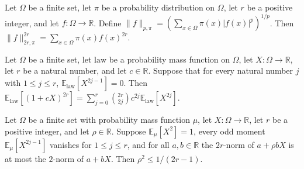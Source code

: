 \begin{theorem}
\label{FABL.pmfLpNorm_even_pow_eq_pmfExpectation_even}
\leanok
{}
Let $\Omega$ be a finite set, let $\pi$ be a probability distribution on $\Omega$, let
$r$ be a positive integer, and let $f:\Omega\to\mathbb R$. Define
$\|f\|_{p,\pi}=\left(\sum_{x\in\Omega}\pi(x)|f(x)|^p\right)^{1/p}$. Then
$\|f\|_{2r,\pi}^{2r}=\sum_{x\in\Omega}\pi(x)f(x)^{2r}$.
\end{theorem}

\begin{theorem}
\label{FABL.pmfExpectation_affine_evenMoment_of_oddMoments}
\leanok
{}
Let $\Omega$ be a finite set, let $\mathrm{law}$ be a probability mass function on
$\Omega$, let $X:\Omega\to\mathbb R$, let $r$ be a natural number, and let $c\in\mathbb
R$. Suppose that for every natural number $j$ with $1\le j\le r$, $\mathbb
E_{\mathrm{law}}[X^{2j-1}]=0$. Then $\mathbb
E_{\mathrm{law}}[(1+cX)^{2r}]=\sum_{j=0}^{r}\binom{2r}{2j}c^{2j}\mathbb
E_{\mathrm{law}}[X^{2j}]$.
\end{theorem}

\begin{theorem}
\label{FABL.isPmfTwoEvenHypercontractive_necessary_sq}
\leanok
{}
Let $\Omega$ be a finite set with probability mass function $\mu$, let
$X:\Omega\to\mathbb{R}$, let $r$ be a positive integer, and let $\rho\in\mathbb{R}$.
Suppose $\mathbb{E}_{\mu}[X^2]=1$, every odd moment $\mathbb{E}_{\mu}[X^{2j-1}]$
vanishes for $1\le j\le r$, and for all $a,b\in\mathbb{R}$ the $2r$-norm of $a+\rho bX$
is at most the $2$-norm of $a+bX$. Then $\rho^2\le 1/(2r-1)$.
\end{theorem}

